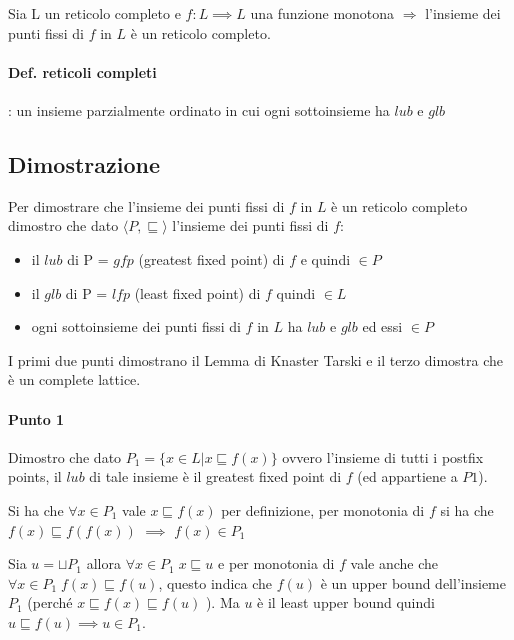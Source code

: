 \documentclass{article}
\begin{document}
Sia L un reticolo completo e $f:L \implies L$ una funzione monotona $\Rightarrow$ l'insieme dei punti fissi di $f$ in $L$ è un reticolo completo.

\paragraph{Def. reticoli completi}: un insieme parzialmente ordinato in cui ogni sottoinsieme ha $lub$ e $glb$

\subsection{Dimostrazione}
Per dimostrare che l'insieme dei punti fissi di $f$ in $L$ è un reticolo completo dimostro che dato $\langle P,\sqsubseteq\rangle$ l'insieme dei punti fissi di $f$:
\begin{itemize}
    \item il $lub$ di P = $gfp$ (greatest fixed point) di $f$ e quindi $\in P$
    \item il $glb$ di P = $lfp$ (least fixed point) di $f$ quindi $\in L$
    \item ogni sottoinsieme dei punti fissi di $f$ in $L$ ha $lub$ e $glb$ ed essi $\in P$
\end{itemize}

I primi due punti dimostrano il Lemma di Knaster Tarski e il terzo dimostra che è un complete lattice.

\paragraph{Punto 1}

Dimostro che dato $P_{1}=\{x \in L | x  \sqsubseteq f(x)\}$ ovvero l'insieme di tutti i postfix points, il $lub$ di tale insieme è il greatest fixed point di $f$ (ed appartiene a $P1$).

Si ha che $\forall x \in P_{1}$ vale $x \sqsubseteq f(x)$ per definizione, per monotonia di $f$ si ha che $f(x)\sqsubseteq f(f(x))$ $\implies$ $f(x) \in P_{1}$ 

Sia $u=\sqcup P_{1}$ allora $\forall x \in P_{1} \; x \sqsubseteq u$ e per monotonia di $f$ vale anche che $\forall x \in P_{1} \; f(x)\sqsubseteq f(u)$, questo indica che $f(u)$ è un upper bound dell'insieme $P_{1}$ (perché $x \sqsubseteq f(x) \sqsubseteq f(u)$ ). Ma $u$ è il least upper bound quindi $u \sqsubseteq f(u) \implies u \in P_{1}$.
\end{document}
